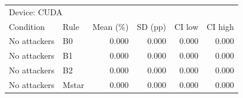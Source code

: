\begin{tabular}{llrrrr}
\toprule
\multicolumn{6}{l}{Device: CUDA} \\
Condition & Rule & Mean (\%) & SD (pp) & CI low & CI high \\
\midrule
No attackers & B0 & 0.000 & 0.000 & 0.000 & 0.000 \\
No attackers & B1 & 0.000 & 0.000 & 0.000 & 0.000 \\
No attackers & B2 & 0.000 & 0.000 & 0.000 & 0.000 \\
No attackers & Mstar & 0.000 & 0.000 & 0.000 & 0.000 \\
\bottomrule
\end{tabular}
